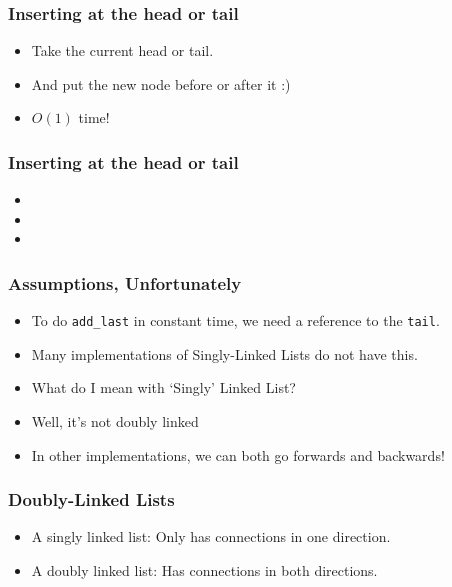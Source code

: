\begin{frame}
	\frametitle{Inserting at the head or tail}
	\begin{itemize}
		\item Take the current head or tail.
		\item And put the new node before or after it :)
		\item \alert{$O(1)$ time!}
	\end{itemize}	


\end{frame}

\begin{frame}
	\frametitle{Inserting at the head or tail}

	
	\begin{itemize}
		\item 
		
		\item 
				
		\item 
	\end{itemize}	

\end{frame}

\begin{frame}
	\frametitle{Assumptions, Unfortunately}
	\begin{itemize}
		\item To do \texttt{add\_last} in constant time, we need a reference to the \texttt{tail}.
		\item Many implementations of Singly-Linked Lists do not have this.
		\item What do I mean with `Singly' Linked List?	
		\item Well, it's not doubly linked
		\item In other implementations, we can both go forwards and backwards!	
	\end{itemize}	

\end{frame}

\begin{frame}
	\frametitle{Doubly-Linked Lists}
	\begin{itemize}
		\item A singly linked list: 	Only has connections in one direction.	
		\item A doubly linked list: 	Has connections in both directions.
	\end{itemize}	

\end{frame}

